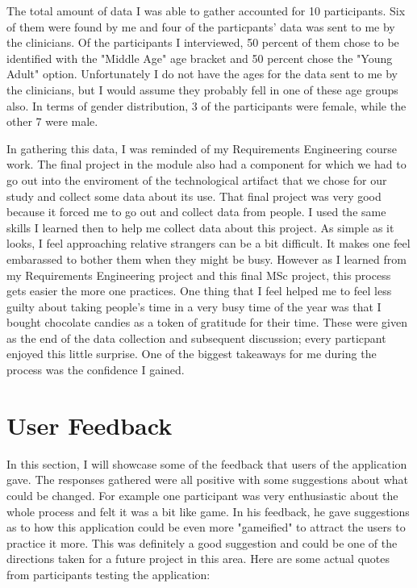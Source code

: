 The total amount of data I was able to gather accounted for 10 participants. Six of them were found by me and four of the particpants' data was sent to me by the clinicians. Of the participants I interviewed, 50 percent of them chose to be identified with the "Middle Age" age bracket and 50 percent chose the "Young Adult" option. Unfortunately I do not have the ages for the data sent to me by the clinicians, but I would assume they probably fell in one of these age groups also. In terms of gender distribution, 3 of the participants were female, while the other 7 were male. 

In gathering this data, I was reminded of my Requirements Engineering course work. The final project in the module also had a component for which we had to go out into the enviroment of the technological artifact that we chose for our study and collect some data about its use. That final project was very good because it forced me to go out and collect data from people. I used the same skills I learned then to help me collect data about this project. As simple as it looks, I feel approaching relative strangers can be a bit difficult. It makes one feel embarassed to bother them when they might be busy. However as I learned from my Requirements Engineering project and this final MSc project, this process gets easier the more one practices. One thing that I feel helped me to feel less guilty about taking people's time in a very busy time of the year was that I bought chocolate candies as a token of gratitude for their time. These were given as the end of the data collection and subsequent discussion; every particpant enjoyed this little surprise. One of the biggest takeaways for me during the process was the confidence I gained. 

\section{User Feedback}
In this section, I will showcase some of the feedback that users of the application gave. The responses gathered were all positive with some suggestions about what could be changed. For example one participant was very enthusiastic about the whole process and felt it was a bit like game. In his feedback, he gave suggestions as to how this application could be even more "gameified" to attract the users to practice it more. This was definitely a good suggestion and could be one of the directions taken for a future project in this area. Here are some actual quotes from participants testing the application:

